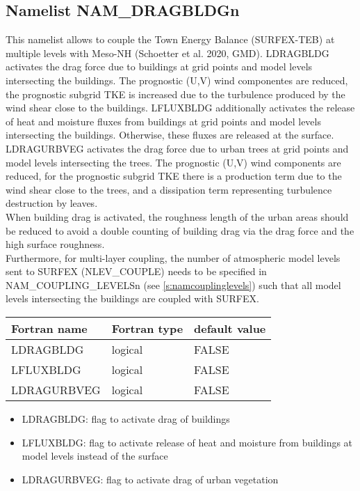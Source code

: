 \subsection{Namelist NAM\_DRAGBLDGn}
\label{s:namdragbldg}
%
This namelist allows to couple the Town Energy Balance (SURFEX-TEB) at multiple levels
with Meso-NH (Schoetter et al. 2020, GMD). LDRAGBLDG activates the drag
force due to buildings at grid points and model levels intersecting the buildings.
The prognostic (U,V) wind componentes are reduced, the prognostic subgrid TKE is increased
due to the turbulence produced by the wind shear close to the buildings.
LFLUXBLDG additionally activates the release of heat and moisture fluxes from buildings
at grid points and model levels intersecting the buildings. Otherwise, these fluxes
are released at the surface. LDRAGURBVEG activates the drag force due to urban trees at grid points
and model levels intersecting the trees. The prognostic (U,V) wind components are reduced,
for the prognostic subgrid TKE there is a production term due to the wind shear close
to the trees, and a dissipation term representing turbulence destruction by leaves. \\
%
When building drag is activated, the roughness length of the urban areas should be
reduced to avoid a double counting of building drag via the drag force and the
high surface roughness. \\
%
Furthermore, for multi-layer coupling, the number of atmospheric model levels
sent to SURFEX (NLEV\_COUPLE) needs to be specified in NAM\_COUPLING\_LEVELSn
(see \ref{s:namcouplinglevels}) such that all model levels intersecting the buildings
are coupled with SURFEX.
%
\begin{center}
\begin{tabular} {|l|l|l|}
\hline
Fortran name & Fortran type & default value \\
\hline
LDRAGBLDG   & logical  & FALSE  \\
LFLUXBLDG   & logical  & FALSE  \\
LDRAGURBVEG & logical  & FALSE  \\
\hline
\end{tabular}
\end{center}
%
\begin{itemize}
\item LDRAGBLDG: flag to activate drag of buildings
\item LFLUXBLDG: flag to activate release of heat and moisture from buildings at model levels instead of the surface
\item LDRAGURBVEG: flag to activate drag of urban vegetation
\end{itemize}
%
